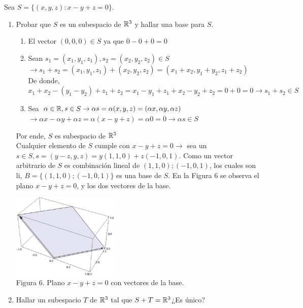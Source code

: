 \item Sea $S=\{(x,y,z):x-y+z=0\}$.
    \begin{enumerate}
        \item Probar que $S$ es un subespacio de $\mathbb{R}^3$ y hallar una base para $S$.
            \begin{mdframed}[style=s]
                \begin{enumerate}
                    \item El vector $(0,0,0)\in S$ ya que $0-0+0=0$
                    \item Sean $s_1=(x_1,y_1,z_1),s_2=(x_2,y_2,z_2)\in S$\\
                        $\to s_1+s_2=(x_1,y_1,z_1)+(x_2,y_2,z_2)=(x_1+x_2,y_1+y_2,z_1+z_2)$\\
                        De donde, $x_1+x_2-(y_1-y_2)+z_1+z_2=x_1-y_1+z_1+x_2-y_2+z_2=0+0=0\to s_1+s_2\in S$
                    \item Sea $\alpha\in\mathbb{R},s\in S\to \alpha s=\alpha(x,y,z)=(\alpha x, \alpha y,\alpha z)$\\
                        $\to \alpha x -\alpha y+\alpha z=\alpha(x-y+z)=\alpha 0=0\to\alpha s\in S$
                \end{enumerate}
                Por ende, $S$ es subespacio de $\mathbb{R}^3$\\
                Cualquier elemento de $S$ cumple con $x-y+z=0\to$ sea un $s\in S,s=(y-z,y,z)=y(1,1,0)+z(-1,0,1)$. Como un vector arbitrario de $S$ es combinación lineal de $(1,1,0);(-1,0,1)$, los cuales son li, $B=\{(1,1,0);(-1,0,1)\}$ es una base de $S$. En la Figura 6 se observa el plano $x-y+z=0$, y los dos vectores de la base.
                \begin{center}
                    \includegraphics[width=0.4\textwidth]{Ej14.png}\\
                    Figura 6. Plano $x-y+z=0$ con vectores de la base.
                \end{center}
            \end{mdframed}
        \item Hallar un subespacio $T$ de $\mathbb{R}^3$ tal que $S+T=\mathbb{R}^3$¿Es único?

\end{enumerate}
